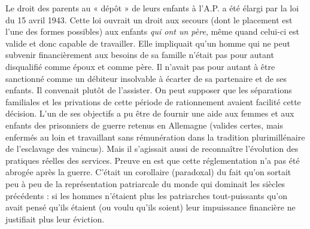  Le droit des parents au « dépôt » de leurs enfants à l'A.P. a été élargi par la loi du 15 avril 1943. Cette loi ouvrait un droit aux secours (dont le placement est l'une des formes possibles) aux enfants \emph{qui ont un père}, même quand celui-ci est valide et donc capable de travailler. Elle impliquait qu'un homme qui ne peut subvenir financièrement aux besoins de sa famille n'était pas pour autant disqualifié comme époux et comme père. Il n'avait pas pour autant à être sanctionné comme un débiteur insolvable à écarter de sa partenaire et de ses enfants. Il convenait plutôt de l'assister.
 On peut supposer que les séparations familiales et les privations de cette période de rationnement avaient facilité cette décision. L'un de ses objectifs a pu être de fournir une aide aux femmes et aux enfants des prisonniers de guerre retenus en Allemagne (valides certes, mais enfermés au loin et travaillant sans rémunération dans la tradition plurimillénaire de l'esclavage des vaincus). Mais il s'agissait aussi de reconnaître l'évolution des pratiques réelles des services. Preuve en est que cette réglementation n'a pas été abrogée après la guerre. 
 C'était un corollaire (paradoxal) du fait qu'on sortait peu à peu de la représentation patriarcale du monde qui dominait les siècles précédents : si les hommes n'étaient plus les patriarches tout-puissants qu'on avait pensé qu'ils étaient (ou voulu qu'ils soient) leur impuissance financière ne justifiait plus leur éviction.